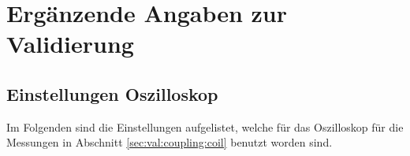\chapter{Erg\"anzende Angaben zur Validierung}
\label{app:validierung}

\section{Einstellungen Oszilloskop}
\label{app:sec:scope:settings}

Im Folgenden sind die Einstellungen  aufgelistet, welche f\"ur das Oszilloskop
f\"ur die  Messungen in  Abschnitt \ref{sec:val:coupling:coil}  benutzt worden
sind.






